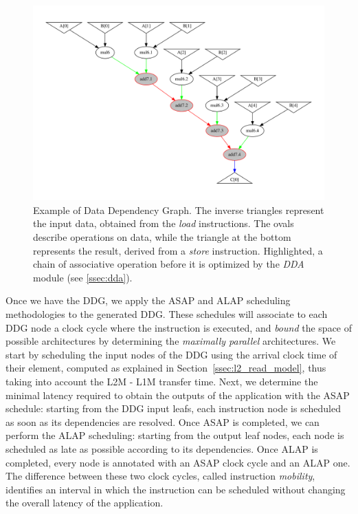 \begin{figure}[tb] 
\centering
\includegraphics[width=.9\columnwidth,left]{images/supernode_2.pdf}
    \caption{\small Example of Data Dependency Graph. The inverse triangles represent the input data, obtained from the \textit{load} instructions. The ovals describe operations on data, while the triangle at the bottom represents the result, derived from a \textit{store} instruction. Highlighted, a chain of associative operation before it is optimized by the \textit{DDA} module (see \ref{ssec:dda}).}
\label{fig:ddg}
\end{figure}
Once we have the DDG, we apply the ASAP and ALAP scheduling methodologies to the generated DDG. These schedules will associate to each DDG node a clock cycle where the instruction is executed, and \textit{bound} the space of possible architectures by determining the \textit{maximally parallel} architectures. We start by scheduling the input nodes of the DDG using the arrival clock time of their element, computed as explained in Section~\ref{ssec:l2_read_model}, thus taking into account the L2M - L1M transfer time. Next, we determine the minimal latency required to obtain the outputs of the application with the ASAP schedule: starting from the DDG input leafs, each instruction node is scheduled as soon as its dependencies are resolved. 
Once ASAP is completed, we can perform the ALAP scheduling: starting from the output leaf nodes, each node is scheduled as late as possible according to its dependencies. Once ALAP is completed, every node is annotated with an ASAP clock cycle and an ALAP one. The difference between these two clock cycles, called instruction \textit{mobility}, identifies an interval in which the instruction can be scheduled without changing the overall latency of the application.

